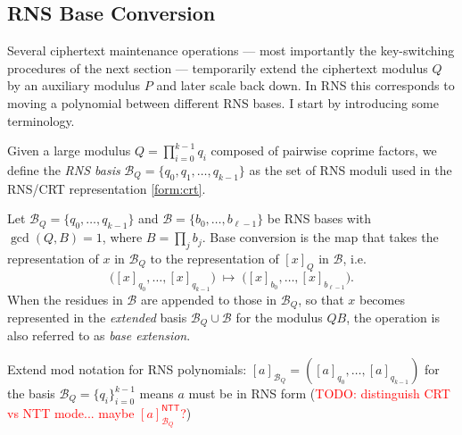 
\subsection{RNS Base Conversion}
\label{sec:rns-base-conversion}
Several ciphertext maintenance operations --- most importantly the key-switching procedures of the next section --- temporarily extend the ciphertext modulus $Q$ by an auxiliary modulus $P$ and later scale back down. In RNS this corresponds to moving a polynomial between different RNS bases. I start by introducing some terminology.

\begin{definition} 
    Given a large modulus $Q = \prod_{i=0}^{k-1} q_i$ composed of pairwise coprime factors, we define the \textit{RNS basis} $\mathcal{B}_Q = \{q_0, q_1, \dots, q_{k-1}\}$ as the set of RNS moduli used in the RNS/CRT representation \eqref{form:crt}.
\end{definition}

\iftrue{ %
    \begin{definition}
        Let $\mathcal{B}_Q = \{q_0,\dots,q_{k-1}\}$ and
        $\mathcal{B} = \{b_0,\dots,b_{\ell-1}\}$ be RNS bases with
        $\gcd(Q, B) = 1$, where $B = \prod_{j} b_j$. Base conversion is
        the map that takes the representation of $x$ in $\mathcal{B}_Q$
        to the representation of $[x]_Q$ in $\mathcal{B}$, i.e.
        \[
            \big([x]_{q_0}, \dots, [x]_{q_{k-1}}\big)
            \;\longmapsto\;
            \big([x]_{b_0}, \dots, [x]_{b_{\ell-1}}\big).
        \]
        When the residues in $\mathcal{B}$ are appended to those in $\mathcal{B}_Q$, so that $x$ becomes represented in the \textit{extended} basis $\mathcal{B}_Q \cup \mathcal{B}$ for the modulus $QB$, the operation is also referred to as \emph{base extension}.
    \end{definition}
}\fi


\begin{remark}
    Extend mod notation for RNS polynomials: $[a]_{\mathcal{B}_Q} = ([a]_{q_0}, \dots, [a]_{q_{k-1}})$ for the basis $\mathcal{B}_Q = \{q_i\}_{i=0}^{k-1}$ means $a$ must be in RNS form (\textcolor{red}{TODO: distinguish CRT vs NTT mode... maybe $[a]^\mathsf{NTT}_{\mathcal{B}_Q}$?})
\end{remark}

